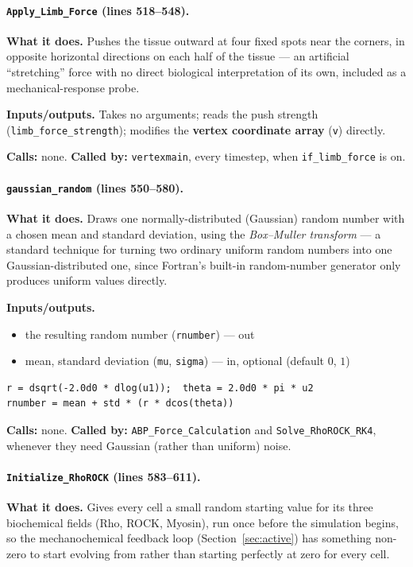 \documentclass[11pt]{article}
\begin{document}
\paragraph{\texttt{Apply\_Limb\_Force} (lines 518--548).}
\textbf{What it does.} Pushes the tissue outward at four fixed spots near the corners,
in opposite horizontal directions on each half of the tissue --- an artificial
``stretching'' force with no direct biological interpretation of its own, included as a
mechanical-response probe.

\textbf{Inputs/outputs.} Takes no arguments; reads the push strength
(\texttt{limb\_force\_strength}); modifies the \textbf{vertex coordinate array}
(\texttt{v}) directly.

\textbf{Calls:} none. \textbf{Called by:} \texttt{vertexmain}, every timestep, when
\texttt{if\_limb\_force} is on.

\paragraph{\texttt{gaussian\_random} (lines 550--580).}
\textbf{What it does.} Draws one normally-distributed (Gaussian) random number with a
chosen mean and standard deviation, using the \emph{Box--Muller transform} --- a
standard technique for turning two ordinary uniform random numbers into one
Gaussian-distributed one, since Fortran's built-in random-number generator only
produces uniform values directly.

\textbf{Inputs/outputs.}
\begin{itemize}[nosep]
  \item the resulting random number (\texttt{rnumber}) --- out
  \item mean, standard deviation (\texttt{mu}, \texttt{sigma}) --- in, optional (default $0$, $1$)
\end{itemize}

\begin{lstlisting}[caption={The Box--Muller transform in \texttt{gaussian\_random}.}]
r = dsqrt(-2.0d0 * dlog(u1));  theta = 2.0d0 * pi * u2
rnumber = mean + std * (r * dcos(theta))
\end{lstlisting}

\textbf{Calls:} none. \textbf{Called by:} \texttt{ABP\_Force\_Calculation} and
\texttt{Solve\_RhoROCK\_RK4}, whenever they need Gaussian (rather than uniform) noise.

\paragraph{\texttt{Initialize\_RhoROCK} (lines 583--611).}
\textbf{What it does.} Gives every cell a small random starting value for its three
biochemical fields (Rho, ROCK, Myosin), run once before the simulation begins, so the
mechanochemical feedback loop (Section~\ref{sec:active}) has something non-zero to
start evolving from rather than starting perfectly at zero for every cell.
\end{document}
